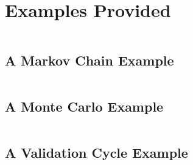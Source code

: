 \chapter{Examples Provided}\label{ch-fp}
\thispagestyle{headings}

$~$\\

\section{A Markov Chain Example}\label{sc-examples-mac}

$~$\\

\section{A Monte Carlo Example}\label{sc-examples-moc}

$~$\\

\section{A Validation Cycle Example}\label{sc-examples-val}

